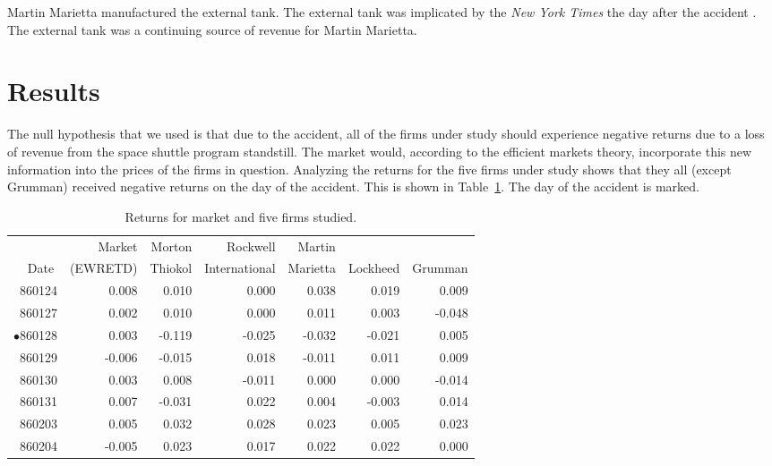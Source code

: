 Martin Marietta manufactured the external tank. The external tank was implicated by the {\em New York Times} the day after the accident \cite{nytexternal}. The external tank was a continuing source of revenue for Martin Marietta.

\section{Results}

The null hypothesis that we used is that due to the accident, all of the firms under study should experience negative returns due to a loss of revenue from the space shuttle program standstill. The market would, according to the efficient markets theory, incorporate this new information into the prices of the firms in question. Analyzing the returns for the five firms under study shows that they all (except Grumman) received negative returns on the day of the accident. This is shown in Table~\ref{returns}. The day of the accident is marked.


\begin{table}[h!]
\caption{Returns for market and five firms studied.}
\sffamily
\begin{tabular*}{6in}{r@{\extracolsep{.5ex}}rrrrrr}
\hline\hline       
       & Market & Morton & Rockwell & Martin &          &         \\
Date$\;$  & ({\footnotesize EWRETD}) & Thiokol & International & Marietta & Lockheed & Grumman \\
\hline
860124 &   0.008 &   0.010 &   0.000 &   0.038 &   0.019 &   0.009 \\
860127 &   0.002 &   0.010 &   0.000 &   0.011 &   0.003 &  -0.048 \\
$\bullet$860128 &   0.003 &  -0.119 &  -0.025 &  -0.032 &  -0.021 &   0.005 \\
860129 &  -0.006 &  -0.015 &   0.018 &  -0.011 &   0.011 &   0.009 \\
860130 &   0.003 &   0.008 &  -0.011 &   0.000 &   0.000 &  -0.014 \\
860131 &   0.007 &  -0.031 &   0.022 &   0.004 &  -0.003 &   0.014 \\
860203 &   0.005 &   0.032 &   0.028 &   0.023 &   0.005 &   0.023 \\
860204 &  -0.005 &   0.023 &   0.017 &   0.022 &   0.022 &   0.000 \\ \hline
\end{tabular*}
\label{returns}
\end{table}

